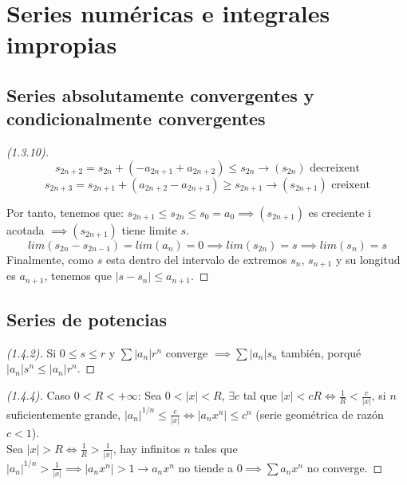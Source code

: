 \section{Series numéricas e integrales impropias}

\subsection{Series absolutamente convergentes y condicionalmente convergentes}

\begin{proof}[(1.3.10)]
    \[
    s_{2n+2}=s_{2n}+(-a_{2n+1}+a_{2n+2}) \leq s_{2n} \rightarrow
    (s_{2n}) \text{ decreixent} 
    \]
    \[
    s_{2n+3}=s_{2n+1}+(a_{2n+2}-a_{2n+3}) \geq s_{2n+1}
    \rightarrow (s_{2n+1}) \text{ creixent}
    \]
    
    Por tanto, tenemos que: $s_{2n+1} \leq s_{2n} \leq s_0 = a_0
    \implies (s_{2n+1})$ es creciente i acotada $\implies
    (s_{2n+1})$ tiene limite $s$.
    \[
        lim(s_{2n}-s_{2n-1})=lim(a_n)=0 \implies lim(s_{2n}) = s
        \implies lim(s_n)=s
    \]
    Finalmente, como $s$ esta dentro del intervalo de extremos
    $s_n$, $s_{n+1}$ y su longitud es $a_{n+1}$, tenemos que $\mid
    s-s_n \mid \leq a_{n+1}$.
\end{proof}

\subsection{Series de potencias}

\begin{proof}[(1.4.2)]
    Si $0 \leq s \leq r$ y $\sum |a_n| r^n$ converge $\implies \sum
    |a_n|s_n$ también, porqué $|a_n|s^n \leq |a_n|r^n$.
\end{proof}

\begin{proof}[(1.4.4)]
    Caso $0 < R < + \infty$: Sea $0<|x|<R$, $\exists c$ tal que
    $|x|<cR \iff \frac{1}{R} < \frac{c}{|x|}$, si $n$
    suficientemente grande, $|a_n|^{1/n} \leq \frac{c}{|x|} \iff
    \mid a_nx^n \mid \leq c^n$ (serie geométrica de razón $c<1$). \\
    Sea $|x|>R \iff \frac{1}{R} > \frac{1}{|x|}$, hay infinitos $n$
    tales que $|a_n|^{1/n} > \frac{1}{|x|} \implies \mid a_nx^n \mid >1
    \rightarrow a_nx^n$ no tiende a $0 \implies \sum a_nx^n$ no converge.
\end{proof}

